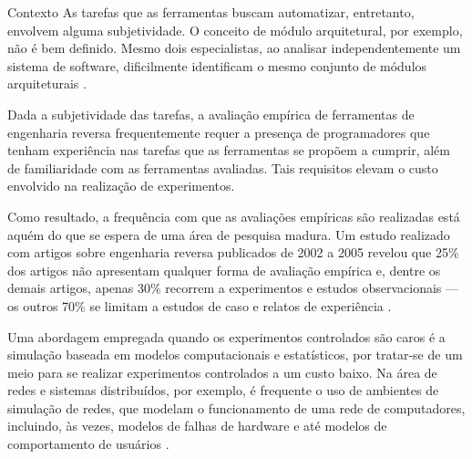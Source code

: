 \begin{section}{Contexto}
	As tarefas que as ferramentas buscam automatizar, entretanto, envolvem alguma subjetividade. O conceito de módulo arquitetural, por exemplo, não é bem definido. Mesmo dois especialistas, ao analisar independentemente um sistema de software, dificilmente identificam o mesmo conjunto de módulos arquiteturais \cite{Koschke2000}. %

	Dada a subjetividade das tarefas, a avaliação empírica de ferramentas de engenharia reversa frequentemente requer a presença de programadores que tenham experiência nas tarefas que as ferramentas se propõem a cumprir, além de familiaridade com as ferramentas avaliadas. Tais requisitos elevam o custo envolvido na realização de experimentos. %
	 
	
	
	Como resultado, a frequência com que as avaliações empíricas são realizadas está aquém do que se espera de uma área de pesquisa madura. Um estudo realizado com artigos sobre engenharia reversa publicados de 2002 a 2005 revelou que 25\% dos artigos não apresentam qualquer forma de avaliação empírica e, dentre os demais artigos, apenas 30\% recorrem a experimentos e estudos observacionais --- os outros 70\% se limitam a estudos de caso e relatos de experiência \cite{Tonella2007}.


		Uma abordagem empregada quando os experimentos controlados são caros é a simulação baseada em modelos computacionais e estatísticos, por tratar-se de um meio para se realizar experimentos controlados a um custo baixo. Na área de redes e sistemas distribuídos, por exemplo, é frequente o uso de ambientes de simulação de redes, que modelam o funcionamento de uma rede de computadores, incluindo, às vezes, modelos de falhas de hardware e até modelos de comportamento de usuários \cite{White2002}. 
		

\end{section}
